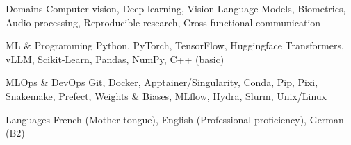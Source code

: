 

\begin{cvskills}

  \cvskill
    {Domains} %
    {Computer vision, Deep learning, Vision-Language Models, Biometrics, Audio processing, Reproducible research, Cross-functional communication} %

  \cvskill
    {ML \& Programming} %
    {Python, PyTorch, TensorFlow, Huggingface Transformers, vLLM, Scikit-Learn, Pandas, NumPy, C++ (basic)} %

  \cvskill
    {MLOps \& DevOps} %
    {Git, Docker, Apptainer/Singularity, Conda, Pip, Pixi, Snakemake, Prefect, Weights \& Biases, MLflow, Hydra, Slurm, Unix/Linux} %

  \cvskill
    {Languages} %
    {French (Mother tongue), English (Professional proficiency), German (B2)} %

\end{cvskills}
